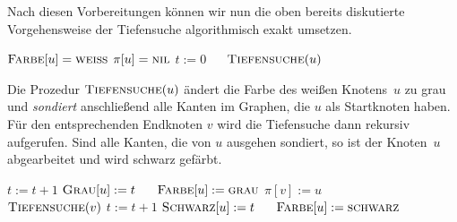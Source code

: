 \begin{bem} 
Nach diesen Vorbereitungen können wir nun die oben bereits diskutierte Vorgehensweise der Tiefensuche algorithmisch exakt umsetzen.


\begin{algorithm}[H]
	\caption{$\cc{Vollständige-Tiefensuche}(D)$}
	\begin{algorithmic}[1]
		 \STATE $\mathop{\text{\textsc{Farbe}}}[u]=\mathop{\text{\textsc{weiß}}}$
		 \STATE $\pi[u]=\mathop{\text{\textsc{nil}}}$
		\ENDFOR
		\STATE $t := 0$ $\quad$ 
		\label{line:tiefensuche-hauptschleife-start}
 		  \STATE $\cc{Tiefensuche}(u)$
 		 \ENDIF 
		\ENDFOR\label{line:tiefensuche-hauptschleife-ende}
	\end{algorithmic}
\end{algorithm}
\end{bem}

\begin{bem} 
Die Prozedur $\cc{Tiefensuche}(u)$ ändert die Farbe des weißen Knotens~$u$ zu grau und \emph{sondiert} anschließend alle Kanten im Graphen, die $u$ als Startknoten haben.
Für den entsprechenden Endknoten $v$ wird die Tiefensuche dann rekursiv aufgerufen.
Sind alle Kanten, die von $u$ ausgehen sondiert, so ist der Knoten~$u$ abgearbeitet und wird schwarz gefärbt.

\begin{algorithm}[H]
	\caption{$\cc{Tiefensuche}(u)$}
	\begin{algorithmic}[1]
		\STATE $t := t + 1$ 
		\STATE $\mathop{\text{\textsc{Grau}}}[u] := t$ $\quad$ 
		\STATE $\mathop{\text{\textsc{Farbe}}}[u]:=\mathop{\text{\textsc{grau}}}$
		 \STATE $\pi[v]:=u$ $\qquad\qquad$ 
		\STATE $\mathop{\text{\textsc{Tiefensuche}}}(v)$
		\ENDIF
		\ENDFOR
		\STATE $t := t + 1$ 
		\STATE\label{line:schwarzfaerbung-in-tiefensuche} $\mathop{\text{\textsc{Schwarz}}}[u] := t$ $\quad$ 
		\STATE $\mathop{\text{\textsc{Farbe}}}[u]:=\mathop{\text{\textsc{schwarz}}}$
	\end{algorithmic}
\end{algorithm}
\end{bem}

